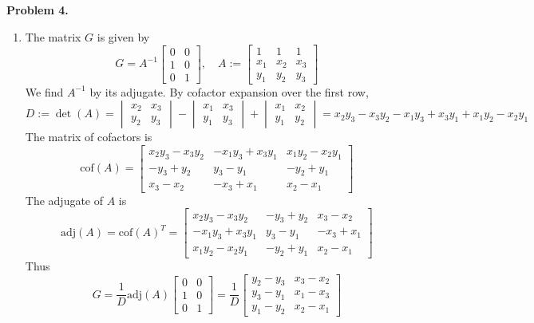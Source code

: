 \documentclass{article}
\def\tbf#1{\textbf{#1}}
\newcommand{\m}[2][b]{\begin{#1matrix}#2\end{#1matrix}}
\newcommand{\inv}{^{-1}}
\begin{document}
\tbf{Problem 4.}

\begin{enumerate}[label=(\alph*)]
	
\item The matrix $G$ is given by
$$G = A\inv \m{0 & 0 \\ 1 & 0 \\ 0 & 1},
\quad A := \m{1 & 1 & 1 \\ x_1 & x_2 & x_3 \\ y_1 & y_2 & y_3}$$
We find $A\inv$ by its adjugate. By cofactor expansion over the first row,
$$D := \det(A)
= \m[v]{x_2 & x_3 \\ y_2 & y_3} - \m[v]{x_1 & x_3 \\ y_1 & y_3} + \m[v]{x_1 & x_2 \\ y_1 & y_2}
= x_2y_3 - x_3y_2 - x_1y_3 + x_3y_1 + x_1y_2 - x_2y_1$$
The matrix of cofactors is
$$\mathrm{cof}(A) = \m{x_2y_3-x_3y_2 & -x_1y_3+x_3y_1 & x_1y_2-x_2y_1 \\ -y_3+y_2 & y_3-y_1 & -y_2+y_1 \\ x_3-x_2 & -x_3+x_1 & x_2-x_1}$$
The adjugate of $A$ is
$$\mathrm{adj}(A) = \mathrm{cof}(A)^T
= \m{x_2y_3-x_3y_2 & -y_3+y_2  & x_3-x_2 \\ -x_1y_3+x_3y_1& y_3-y_1 & -x_3+x_1 \\ x_1y_2-x_2y_1 & -y_2+y_1 & x_2-x_1}$$
Thus
$$G = \frac{1}{D}\mathrm{adj}(A)\m{0 & 0 \\ 1 & 0 \\ 0 & 1}
= \frac{1}{D}\m{y_2-y_3 & x_3-x_2 \\ y_3-y_1 & x_1-x_3 \\ y_1-y_2 & x_2-x_1}$$


\end{enumerate}
\end{document}
